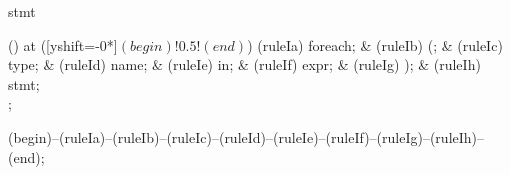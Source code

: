 \begin{syntax}{stmt}
  
  \node[sequence,column sep=0.6cm] () at ([yshift=-0*\syntaxruledist]$(begin)!0.5!(end)$) {
    \node[terminal]    (ruleIa) {foreach};
    &
    \node[terminal]    (ruleIb) {(};
    &
    \node[nonterminal] (ruleIc) {type};
    &
    \node[nonterminal] (ruleId) {name};
    &
    \node[terminal]    (ruleIe) {in};
    &
    \node[nonterminal] (ruleIf) {expr};
    &
    \node[terminal]    (ruleIg) {)};
    &
    \node[nonterminal] (ruleIh) {stmt};
    \\
  };
  
  \draw[path] (begin)--(ruleIa)--(ruleIb)--(ruleIc)--(ruleId)--(ruleIe)--(ruleIf)--(ruleIg)--(ruleIh)--(end);
\end{syntax}
